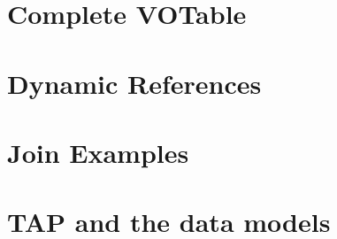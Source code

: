 \documentclass[11pt,a4paper]{ivoa}
\begin{document}
\section{Complete VOTable} \label{appendix_A}


\section{Dynamic References}\label{appen_dynref}


\section{Join Examples}\label{appen_join}


\section{TAP and the data models}\label{appen_votable}





\end{document}

